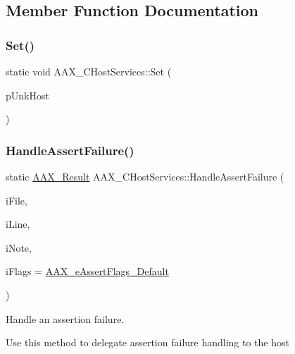 \subsection{Member Function Documentation}
\mbox{\label{a01489_af927887d03f4f978fb90d8ac3df1f205}} 
\subsubsection{\texorpdfstring{Set()}{Set()}}
{\footnotesize\ttfamily static void A\+A\+X\+\_\+\+C\+Host\+Services\+::\+Set (\begin{DoxyParamCaption}\item[{\mbox{\hyperlink{a01409}{I\+A\+C\+F\+Unknown}} $\ast$}]{p\+Unk\+Host }\end{DoxyParamCaption})\hspace{0.3cm}{\ttfamily [static]}}

\mbox{\label{a01489_a17f333ba14d681bc84309b8a5632e6a4}} 
\subsubsection{\texorpdfstring{HandleAssertFailure()}{HandleAssertFailure()}}
{\footnotesize\ttfamily static \mbox{\hyperlink{a00392_a4d8f69a697df7f70c3a8e9b8ee130d2f}{A\+A\+X\+\_\+\+Result}} A\+A\+X\+\_\+\+C\+Host\+Services\+::\+Handle\+Assert\+Failure (\begin{DoxyParamCaption}\item[{const char $\ast$}]{i\+File,  }\item[{int32\+\_\+t}]{i\+Line,  }\item[{const char $\ast$}]{i\+Note,  }\item[{int32\+\_\+t}]{i\+Flags = {\ttfamily \mbox{\hyperlink{a00491_ab87a565fcd58c3d860d50a210b264985a46c4ae37bd14e71bfd34781038f5f508}{A\+A\+X\+\_\+e\+Assert\+Flags\+\_\+\+Default}}} }\end{DoxyParamCaption})\hspace{0.3cm}{\ttfamily [static]}}



Handle an assertion failure. 

Use this method to delegate assertion failure handling to the host

